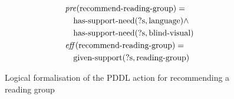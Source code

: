 \begin{figure}[t]
  \small  %
  \begin{align*}
  &\mathit{pre}(\text{recommend-reading-group}) = \\
  &\quad \text{has-support-need}(\text{?s}, \text{language}) \land \\
  &\quad \text{has-support-need}(\text{?s}, \text{blind-visual}) \\
  &\mathit{eff}(\text{recommend-reading-group}) = \\
  &\quad \text{given-support}(\text{?s}, \text{reading-group})
  \end{align*}
  \caption{Logical formalisation of the PDDL action for recommending a reading group}\label{fig:reading-group}
\end{figure}